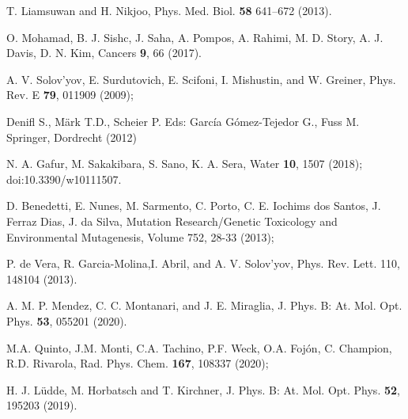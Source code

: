 \documentclass[10pt,showpacs,showkeys,twocolumn]{revtex4}
\begin{document}
\begin{thebibliography}{}

 T. Liamsuwan and H. Nikjoo, Phys. Med. Biol. \textbf{58}  641--672 (2013).

O. Mohamad, B. J. Sishc, J. Saha, A. Pompos, A. Rahimi, M. D. Story, A. J. Davis, D. N. Kim, Cancers \textbf{9}, 66 (2017).

 A. V. Solov'yov, E. Surdutovich, E. Scifoni, I. Mishustin, and W. Greiner, Phys. Rev. E \textbf{79}, 011909 (2009);

Denifl S., Märk T.D., Scheier P. 
Eds: Garc\'ia G\'omez-Tejedor G., Fuss M. 
Springer, Dordrecht (2012) 

 N. A. Gafur, M.  Sakakibara, S. Sano, K. A. Sera, 
Water \textbf{10}, 1507 (2018); doi:10.3390/w10111507.

 D. Benedetti, E. Nunes, M. Sarmento, C. Porto, C. E. Iochims dos Santos, J. Ferraz Dias, J. da Silva,
Mutation Research/Genetic Toxicology and Environmental Mutagenesis,
Volume 752, 28-33 (2013);

 P. de Vera, R. Garcia-Molina,I. Abril, and A. V. Solov’yov, Phys. Rev. Lett.  110, 148104 (2013).

A. M. P. Mendez, C. C. Montanari, and J. E. Miraglia, J. Phys. B: At. Mol. Opt. Phys.  \textbf{53}, 055201 (2020).

 M.A. Quinto, J.M. Monti, C.A. Tachino, P.F. Weck, O.A. Foj\'on, C. Champion, R.D. Rivarola, 
Rad. Phys. Chem. \textbf{167}, 108337 (2020);

H. J. L\"udde,  M. Horbatsch and T. Kirchner, J. Phys. B: At. Mol. Opt. Phys.  \textbf{52}, 195203 (2019).


\end{thebibliography}
\end{document}
